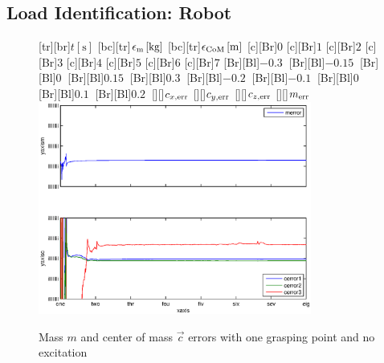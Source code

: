 \subsection{Load Identification: Robot}
\begin{figure}
	\centering	
	[tr][br]{$t\left[\mathrm{s}\right]$}
	[bc][tr]{$\epsilon_{\mathrm{m}}\left[\mathrm{kg}\right]$}
	[bc][tr]{$\epsilon_{\mathrm{CoM}}\left[\mathrm{m}\right]$}
	[Br]{$0$}
	[Br]{$1$}
	[Br]{$2$}
	[Br]{$3$}
	[Br]{$4$}
	[Br]{$5$}
	[Br]{$6$}
	[Br]{$7$}
	[Br][Bl]{$-0.3\  $}
	[Br][Bl]{$-0.15\ $}
	[Br][Bl]{$0\  $}
	[Br][Bl]{$0.15\  $}
	[Br][Bl]{$0.3\  $}
	[Br][Bl]{$-0.2\  $}
	[Br][Bl]{$-0.1\ $}
	[Br][Bl]{$0\  $}
	[Br][Bl]{$0.1\  $}
	[Br][Bl]{$0.2\  $}
	[][]{\tiny $c_{x,\mathrm{err}}$}
	[][]{\tiny $c_{y,\mathrm{err}}$}
	[][]{\tiny $c_{z,\mathrm{err}}$}
	[][]{\tiny $m_{\mathrm{err}}$}
	\includegraphics[width=0.8\textwidth]{figures/one_grasping_point_no_movement_mass_and_cog.eps}
	\vspace{0.2cm}
	\caption[Mass error, one grasping point, no excitation]{Mass $m$ and center of mass $\vec{c}$ errors with one grasping point and no excitation}
	\label{fig:estim_mass_one_no_movement}
\end{figure}

